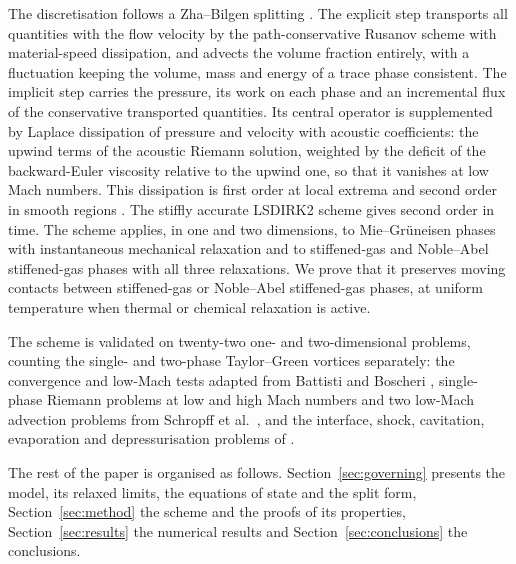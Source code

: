 The discretisation follows a Zha--Bilgen splitting \cite{ZhaBilgen1993}. The explicit step transports all quantities
with the flow velocity by the path-conservative Rusanov scheme \cite{Pares2006,Castro2006} with material-speed
dissipation, and advects the volume fraction entirely, with a fluctuation keeping the volume, mass and energy of a trace
phase consistent. The implicit step carries the pressure, its work on each phase and an incremental flux of the
conservative transported quantities. Its central operator is supplemented by Laplace dissipation of pressure and
velocity with acoustic coefficients: the upwind terms of the acoustic Riemann solution, weighted by the deficit of the
backward-Euler viscosity relative to the upwind one, so that it vanishes at low Mach numbers. This dissipation is first
order at local extrema and second order in smooth regions \cite{Jameson1995}. The stiffly accurate LSDIRK2 scheme
\cite{BoscarinoFilbetRusso2016} gives second order in time. The scheme applies, in one and two dimensions, to
Mie--Gr\"uneisen phases with instantaneous mechanical relaxation and to stiffened-gas and Noble--Abel stiffened-gas
phases with all three relaxations. We prove that it preserves moving contacts between stiffened-gas or Noble--Abel
stiff\-ened-gas phases, at uniform temperature when thermal or chemical relaxation is active.

The scheme is validated on twenty-two one- and two-dimensional problems, counting the single- and two-phase
Taylor--Green vortices separately: the convergence and low-Mach tests adapted from Battisti and Boscheri
\cite{BattistiBoscheri2025}, single-phase Riemann problems at low and high Mach numbers and two low-Mach advection
problems from Schropff et al.\ \cite{Schropff2026}, and the interface, shock, cavitation, evaporation and
depressurisation problems of \cite{SPB2009,PelantiShyue2014,Pelanti2022}.

The rest of the paper is organised as follows. Section~\ref{sec:governing} presents the model, its relaxed limits, the
equations of state and the split form, Section~\ref{sec:method} the scheme and the proofs of its properties,
Section~\ref{sec:results} the numerical results and Section~\ref{sec:conclusions} the conclusions.

